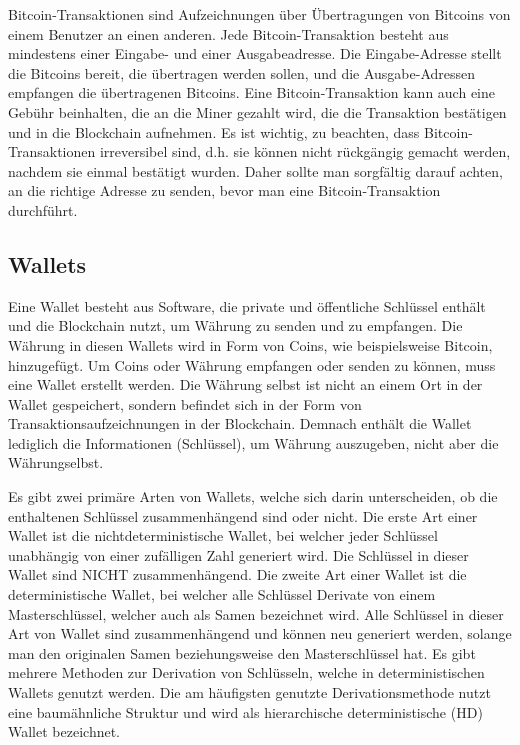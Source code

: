 Bitcoin-Transaktionen sind Aufzeichnungen über Übertragungen von Bitcoins von einem Benutzer an einen anderen. Jede
Bitcoin-Transaktion besteht aus mindestens einer Eingabe- und einer Ausgabeadresse. Die Eingabe-Adresse stellt die Bitcoins
bereit, die übertragen werden sollen, und die Ausgabe-Adressen empfangen die übertragenen Bitcoins. Eine Bitcoin-Transaktion
kann auch eine Gebühr beinhalten, die an die Miner gezahlt wird, die die Transaktion bestätigen und in die Blockchain aufnehmen.
Es ist wichtig, zu beachten, dass Bitcoin-Transaktionen irreversibel sind, d.h. sie können nicht rückgängig gemacht werden,
nachdem sie einmal bestätigt wurden. Daher sollte man sorgfältig darauf achten, an die richtige Adresse zu senden, bevor man eine
Bitcoin-Transaktion durchführt.

\subsection{Wallets}
Eine Wallet besteht aus Software, die private und öffentliche Schlüssel enthält und die Blockchain nutzt, um Währung zu senden
und zu empfangen. Die Währung in diesen Wallets wird in Form von Coins, wie beispielsweise Bitcoin, hinzugefügt. Um Coins oder
Währung empfangen oder senden zu können, muss eine Wallet erstellt werden. Die Währung selbst ist nicht an einem Ort in der Wallet
gespeichert, sondern befindet sich in der Form von Transaktionsaufzeichnungen in der Blockchain.  Demnach enthält 
die Wallet lediglich die Informationen (Schlüssel), um Währung auszugeben, nicht aber die Währungselbst.

Es gibt zwei primäre Arten von Wallets, welche sich darin unterscheiden, ob die enthaltenen Schlüssel zusammenhängend sind oder
nicht. Die erste Art einer Wallet ist die nichtdeterministische Wallet, bei welcher jeder Schlüssel unabhängig von einer 
zufälligen Zahl generiert wird. Die Schlüssel in dieser Wallet sind NICHT zusammenhängend. Die zweite Art einer Wallet ist die
deterministische Wallet, bei welcher alle Schlüssel Derivate von einem Masterschlüssel, welcher auch als Samen bezeichnet wird.
Alle Schlüssel in dieser Art von Wallet sind zusammenhängend und können neu generiert werden, solange man den originalen Samen
beziehungsweise den Masterschlüssel hat. Es gibt mehrere Methoden zur Derivation von Schlüsseln, welche in deterministischen
Wallets genutzt werden. Die am häufigsten genutzte Derivationsmethode nutzt eine baumähnliche Struktur und wird als 
hierarchische deterministische (HD) Wallet bezeichnet. 

